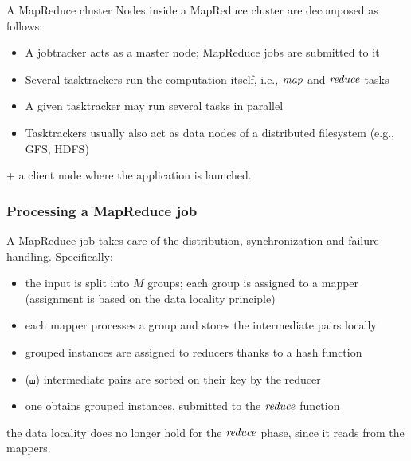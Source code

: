 \begin{frame}{A MapReduce cluster}
Nodes inside a MapReduce cluster are decomposed as follows:
\begin{itemize}
\item A \alert{jobtracker} acts as a master node; MapReduce jobs are
submitted to it

\item Several \alert{tasktrackers} run the computation itself, i.e.,
$\mathop{\mathit{map}}$ and $\mathop{\mathit{reduce}}$ tasks

\item A given tasktracker may run several tasks in parallel

\item Tasktrackers usually also act as \alert{data nodes} of a
distributed filesystem (e.g., GFS, HDFS)
\end{itemize}

+ a client node where the application is launched.
\end{frame}

\begin{frame}
\frametitle{Processing a MapReduce job}

A MapReduce \alert{job} takes care of the distribution, 
synchronization and failure handling. Specifically:
\begin{itemize}
  \item the input is split into $M$ groups; each group is assigned to a
  \alert{mapper} (assignment is based on the data locality principle)

    \item each mapper processes a group and stores the intermediate pairs
    locally
  \item grouped instances are assigned to \alert{reducers} thanks
    to a hash function
    \item ($\shuffle$) intermediate pairs are sorted on their key by the reducer

    \item
    one obtains grouped instances, submitted to the $\mathop{\mathit{reduce}}$ function
  \end{itemize}
the data locality does no longer hold for the $\mathop{\mathit{reduce}}$ phase, since it
reads from the mappers.
\end{frame}

